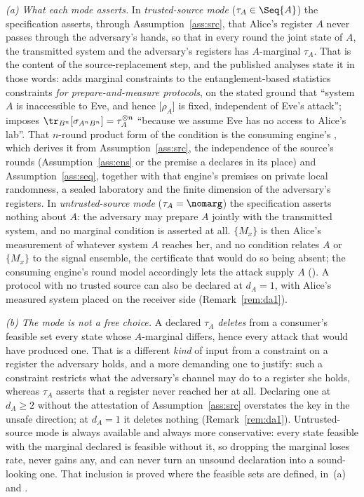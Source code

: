 \begin{remark}\label{rem:source-mode}
\emph{(a) What each mode asserts.} In \emph{trusted-source mode}
($\tau_A\in\Seq{A}$) the specification asserts, through
Assumption~\ref{ass:src}, that Alice's register $A$ never passes through
the adversary's hands, so that in every round the joint state of $A$, the
transmitted system and the adversary's registers has $A$-marginal $\tau_A$.
That is the content of the source-replacement step, and the published
analyses state it in those words:
\cite[Eqs.~(36)--(39)]{winick2018reliable} adds marginal constraints to
the entanglement-based statistics constraints \emph{for prepare-and-measure
protocols}, on the stated ground that ``system $A$ is inaccessible to Eve,
and hence [$\rho_A$] is fixed, independent of Eve's attack'';
\cite[Rem.~1]{kamin2025renyi} imposes
$\tr_{B^n}[\sigma_{A^nB^n}]=\tau_A^{\otimes n}$ ``because we assume Eve has
no access to Alice's lab''. That $n$-round product form of the condition is
the consuming engine's , which derives
it from Assumption~\ref{ass:src}, the independence of the source's rounds
(Assumption~\ref{ass:ens} or the premise a  declares in
its place) and Assumption~\ref{ass:seq}, together with that engine's
premises on private local randomness, a sealed laboratory and the finite
dimension of the adversary's registers. In \emph{untrusted-source mode}
($\tau_A=\nomarg$) the specification asserts nothing about $A$: the
adversary may prepare $A$ jointly with the transmitted system, and no
marginal condition is asserted at all. $\{M_x\}$ is then Alice's
measurement of whatever system $A$ reaches her, and no condition relates
$A$ or $\{M_x\}$ to the signal ensemble, the certificate that would do so
being absent; the consuming engine's round model accordingly lets the
attack supply $A$ (). A protocol with no
trusted source can also be declared at $d_A=1$, with Alice's measured system
placed on the receiver side (Remark~\ref{rem:da1}).

\emph{(b) The mode is not a free choice.} A declared $\tau_A$ \emph{deletes}
from a consumer's feasible set every state whose $A$-marginal differs,
hence every attack that would have produced one. That is a different
\emph{kind} of input from a constraint on a register the adversary holds,
and a more demanding one to justify: such a constraint restricts what the
adversary's channel may do to a register she holds, whereas $\tau_A$
asserts that a register never reached her at all. Declaring one at
$d_A\ge2$ without the attestation of Assumption~\ref{ass:src} overstates the
key in the unsafe direction; at $d_A=1$ it deletes nothing
(Remark~\ref{rem:da1}).
Untrusted-source mode is always available and always more conservative:
every state feasible with the marginal declared is feasible without it, so
dropping the marginal loses rate, never gains any, and can never turn an
unsound declaration into a sound-looking one. That inclusion is proved
where the feasible sets are defined, in \,(a)
and .


\end{remark}
